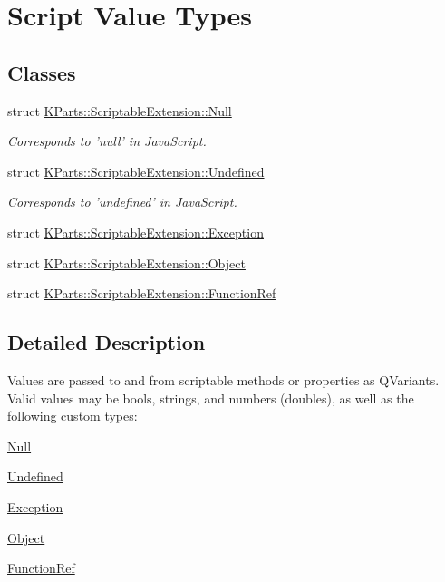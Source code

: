 \hypertarget{group__ScriptValueTypes}{\section{\-Script \-Value \-Types}
\label{group__ScriptValueTypes}
}
\subsection*{\-Classes}
\begin{DoxyCompactItemize}
\item 
struct \hyperlink{structKParts_1_1ScriptableExtension_1_1Null}{\-K\-Parts\-::\-Scriptable\-Extension\-::\-Null}
\begin{DoxyCompactList}\small\item\em \-Corresponds to 'null' in \-Java\-Script. \end{DoxyCompactList}\item 
struct \hyperlink{structKParts_1_1ScriptableExtension_1_1Undefined}{\-K\-Parts\-::\-Scriptable\-Extension\-::\-Undefined}
\begin{DoxyCompactList}\small\item\em \-Corresponds to 'undefined' in \-Java\-Script. \end{DoxyCompactList}\item 
struct \hyperlink{structKParts_1_1ScriptableExtension_1_1Exception}{\-K\-Parts\-::\-Scriptable\-Extension\-::\-Exception}
\item 
struct \hyperlink{structKParts_1_1ScriptableExtension_1_1Object}{\-K\-Parts\-::\-Scriptable\-Extension\-::\-Object}
\item 
struct \hyperlink{structKParts_1_1ScriptableExtension_1_1FunctionRef}{\-K\-Parts\-::\-Scriptable\-Extension\-::\-Function\-Ref}
\end{DoxyCompactItemize}


\subsection{\-Detailed \-Description}
\-Values are passed to and from scriptable methods or properties as \-Q\-Variants. \-Valid values may be bools, strings, and numbers (doubles), as well as the following custom types\-: \begin{DoxyItemize}
\item \hyperlink{structKParts_1_1ScriptableExtension_1_1Null}{\-Null} \item \hyperlink{structKParts_1_1ScriptableExtension_1_1Undefined}{\-Undefined} \item \hyperlink{structKParts_1_1ScriptableExtension_1_1Exception}{\-Exception} \item \hyperlink{structKParts_1_1ScriptableExtension_1_1Object}{\-Object} \item \hyperlink{structKParts_1_1ScriptableExtension_1_1FunctionRef}{\-Function\-Ref} \end{DoxyItemize}
